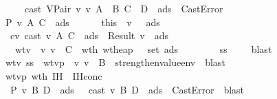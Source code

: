 \begin{isabellebody}
\ \ \ \ \ \ \ \ {\isasymor}\ cast\ {\isacharparenleft}VPair\ v{}\ v{}{\isacharparenright}\ {\isacharparenleft}A\ {\isasymtimes}\ B{\isacharparenright}\ {\isacharparenleft}C\ {\isasymtimes}\ D{\isacharparenright}\ {\isasymmu}\ ads{}\ {\isacharequal}\ CastError{\isachardoublequoteclose}\isanewline
\ \ \isamarkupfalse \isanewline
\ \ \ \ \isamarkupfalse \ {\isachardoublequoteopen}{\isacharquery}P\ v{}\ A\ C\ {\isasymmu}\ ads{}\ {\isasymSigma}{\isachardoublequoteclose}\isanewline
\ \ \ \ \isamarkupfalse \ this\ \isamarkupfalse \ v{}{\isacharprime}\ {\isasymSigma}{}\ {\isasymmu}{}\ ads{}\ \isanewline
\ \ \ \ \ \ cv{}{\isacharcolon}\ {\isachardoublequoteopen}cast\ v{}\ A\ C\ {\isasymmu}\ ads{}\ {\isacharequal}\ Result\ {\isacharparenleft}v{}{\isacharprime}{\isacharcomma}\ {\isasymmu}{}{\isacharcomma}\ ads{}{\isacharparenright}{\isachardoublequoteclose}\isanewline
\ \ \ \ \ \ \ wtv{}{\isacharcolon}\ {\isachardoublequoteopen}{\isasymSigma}{}\ {\isasymturnstile}v\ v{}{\isacharprime}\ {\isacharcolon}\ C{\isachardoublequoteclose}\ \ wth{}{\isacharcolon}\ {\isachardoublequoteopen}wt{\isacharunderscore}heap\ {\isasymSigma}{}\ {\isasymmu}{}\ {\isacharparenleft}set\ ads{}{\isacharparenright}{\isachardoublequoteclose}\ \isanewline
\ \ \ \ \ \ \ s{}s{\isacharcolon}\ {\isachardoublequoteopen}{\isasymSigma}{}\ {\isasymsqsubseteq}\ {\isasymSigma}{\isachardoublequoteclose}\ \isamarkupfalse \ blast\isanewline
\ \ \ \ \isamarkupfalse \ wtv{}\ s{}s\ \isamarkupfalse \ wtv{}p{\isacharcolon}\ {\isachardoublequoteopen}{\isasymSigma}{}\ {\isasymturnstile}v\ v{}\ {\isacharcolon}\ B{\isachardoublequoteclose}\ \isamarkupfalse \ strengthen{\isacharunderscore}value{\isacharunderscore}env\ \isamarkupfalse \ blast\ \isamarkupfalse \isanewline
\ \ \ \ \isamarkupfalse \ wtv{}p\ wth{}\ IH{}\ \isamarkupfalse \ IH{}conc{\isacharcolon}\isanewline
\ \ \ \ \ \ {\isachardoublequoteopen}{\isacharquery}P\ v{}\ B\ D\ {\isasymmu}{}\ ads{}\ {\isasymSigma}{}\ {\isasymor}\ {\isacharparenleft}cast\ v{}\ B\ D\ {\isasymmu}{}\ ads{}\ {\isacharequal}\ CastError{\isacharparenright}{\isachardoublequoteclose}\ \isamarkupfalse \ blast\ \isamarkupfalse \isanewline

\end{isabellebody}
